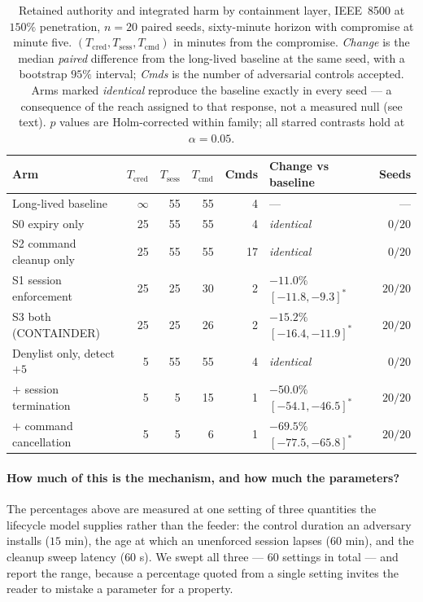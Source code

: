 \begin{table}[t]
\centering
\caption{Retained authority and integrated harm by containment layer, IEEE~8500 at $150\%$
penetration, $n{=}20$ paired seeds, sixty-minute horizon with compromise at minute five.
$(T_{\mathrm{cred}}, T_{\mathrm{sess}}, T_{\mathrm{cmd}})$ in minutes from the compromise.
\emph{Change} is the median \emph{paired} difference from the long-lived baseline at the same
seed, with a bootstrap $95\%$ interval; \emph{Cmds} is the number of adversarial controls
accepted. Arms marked \emph{identical} reproduce the baseline exactly in every seed --- a
consequence of the reach assigned to that response, not a measured null (see text). $p$ values
are Holm-corrected within family; all starred contrasts hold at $\alpha=0.05$.}
\label{tab:lifecycle}
\small
\begin{tabular}{@{}lrrrrlr@{}}
\toprule
Arm & $T_{\mathrm{cred}}$ & $T_{\mathrm{sess}}$ & $T_{\mathrm{cmd}}$ & Cmds & Change vs baseline &
Seeds \\
\midrule
Long-lived baseline            & $\infty$ & 55 & 55 & 4  & ---                            & --- \\
S0 expiry only                 & 25 & 55 & 55 & 4  & \emph{identical}                     & $0/20$ \\
S2 command cleanup only        & 25 & 55 & 55 & 17 & \emph{identical}                     & $0/20$ \\
S1 session enforcement         & 25 & 25 & 30 & 2  & $-11.0\%$ $[-11.8, -9.3]^{\ast}$     & $20/20$ \\
S3 both (CONTAINDER)           & 25 & 25 & 26 & 2  & $-15.2\%$ $[-16.4, -11.9]^{\ast}$    & $20/20$ \\
\midrule
Denylist only, detect $+5$     & 5  & 55 & 55 & 4  & \emph{identical}                     & $0/20$ \\
\quad $+$ session termination  & 5  & 5  & 15 & 1  & $-50.0\%$ $[-54.1, -46.5]^{\ast}$    & $20/20$ \\
\quad $+$ command cancellation & 5  & 5  & 6  & 1  & $-69.5\%$ $[-77.5, -65.8]^{\ast}$    & $20/20$ \\
\bottomrule
\end{tabular}
\end{table}

\paragraph{How much of this is the mechanism, and how much the parameters?} The percentages above
are measured at one setting of three quantities the lifecycle model supplies rather than the
feeder: the control duration an adversary installs ($15$ min), the age at which an unenforced
session lapses ($60$ min), and the cleanup sweep latency ($60$ s). We swept all three ---
$60$ settings in total --- and report the range, because a percentage quoted from a single setting
invites the reader to mistake a parameter for a property.

